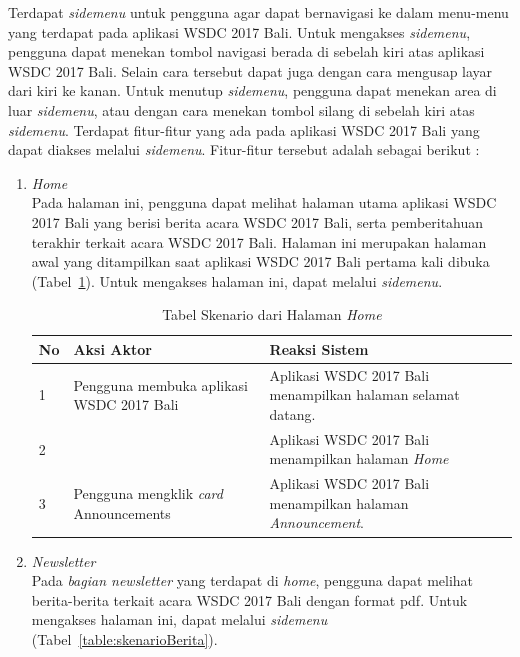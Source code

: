 Terdapat {\it sidemenu} untuk pengguna agar dapat bernavigasi ke dalam menu-menu yang terdapat pada aplikasi WSDC 2017 Bali. Untuk mengakses {\it sidemenu}, pengguna dapat menekan tombol navigasi berada di sebelah kiri atas aplikasi WSDC 2017 Bali. Selain cara tersebut dapat juga dengan cara mengusap layar dari kiri ke kanan. Untuk menutup {\it sidemenu}, pengguna dapat menekan area di luar {\it sidemenu}, atau dengan cara menekan tombol silang di sebelah kiri atas {\it sidemenu}. Terdapat fitur-fitur yang ada pada aplikasi WSDC 2017 Bali yang dapat diakses melalui {\it sidemenu}. Fitur-fitur tersebut adalah sebagai berikut :

\begin{enumerate}
	\item \textit{Home} \\
	Pada halaman ini, pengguna dapat melihat halaman utama aplikasi WSDC 2017 Bali yang berisi berita acara WSDC 2017 Bali, serta pemberitahuan terakhir terkait acara WSDC 2017 Bali. Halaman ini merupakan halaman awal yang ditampilkan saat aplikasi WSDC 2017 Bali pertama kali dibuka (Tabel~\ref{table:skenarioHalamanUtama}). Untuk mengakses halaman ini, dapat melalui \textit{sidemenu}.
		\begin{table}[H]
			\centering
			\caption{Tabel Skenario dari Halaman \textit{Home}}
			\begin{tabular}{|p{0.5cm}|p{7cm}|p{7cm}|}
				\hline
				No & Aksi Aktor                               & Reaksi Sistem                                          \\ \hline
				1  & Pengguna membuka aplikasi WSDC 2017 Bali & Aplikasi WSDC 2017 Bali menampilkan halaman selamat datang. \\ \hline
				2  &                                          & Aplikasi WSDC 2017 Bali menampilkan halaman \textit{Home}           \\ \hline
				3  & Pengguna mengklik {\it card} Announcements & Aplikasi WSDC 2017 Bali menampilkan halaman \textit{Announcement}. \\ \hline
			\end{tabular}
			\label{table:skenarioHalamanUtama}
		\end{table}
	\item \textit{Newsletter} \\ 
	Pada \textit{bagian newsletter} yang terdapat di \textit{home}, pengguna dapat melihat berita-berita terkait acara WSDC 2017 Bali dengan format pdf. Untuk mengakses halaman ini, dapat melalui \textit{sidemenu} (Tabel~\ref{table:skenarioBerita}).

\end{enumerate}
